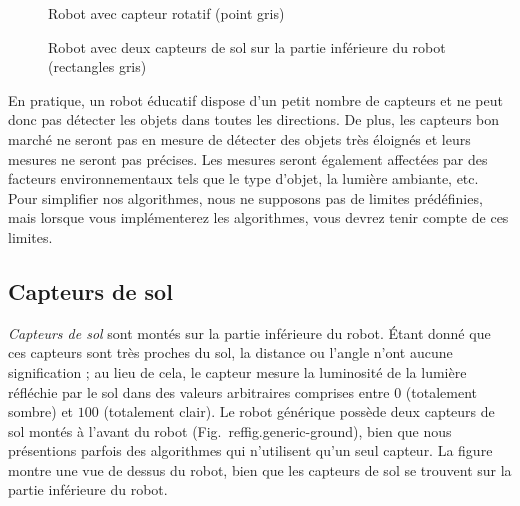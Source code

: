 {\begin{figure}
\begin{minipage}{.45\textwidth}
\caption{Robot avec capteur rotatif (point gris)}
\label{fig.generic-sensor}
\end{minipage}
\hspace{\fill}
\begin{minipage}{.45\textwidth}
\caption{Robot avec deux capteurs de sol sur la partie inférieure du robot (rectangles gris)}
\label{fig.generic-ground}
\end{minipage}
\end{figure}


En pratique, un robot éducatif dispose d'un petit nombre de capteurs et ne peut donc pas détecter les objets dans toutes les directions. De plus, les capteurs bon marché ne seront pas en mesure de détecter des objets très éloignés et leurs mesures ne seront pas précises. Les mesures seront également affectées par des facteurs environnementaux tels que le type d'objet, la lumière ambiante, etc. Pour simplifier nos algorithmes, nous ne supposons pas de limites prédéfinies, mais lorsque vous implémenterez les algorithmes, vous devrez tenir compte de ces limites.

\subsection{Capteurs de sol}

\emph{Capteurs de sol} sont montés sur la partie inférieure du robot. Étant donné que ces capteurs sont très proches du sol, la distance ou l'angle n'ont aucune signification ; au lieu de cela, le capteur mesure la luminosité de la lumière réfléchie par le sol dans des valeurs arbitraires comprises entre $0$ (totalement sombre) et $100$ (totalement clair). Le robot générique possède deux capteurs de sol montés à l'avant du robot (Fig.~ref{fig.generic-ground}), bien que nous présentions parfois des algorithmes qui n'utilisent qu'un seul capteur. La figure montre une vue de dessus du robot, bien que les capteurs de sol se trouvent sur la partie inférieure du robot.

}
